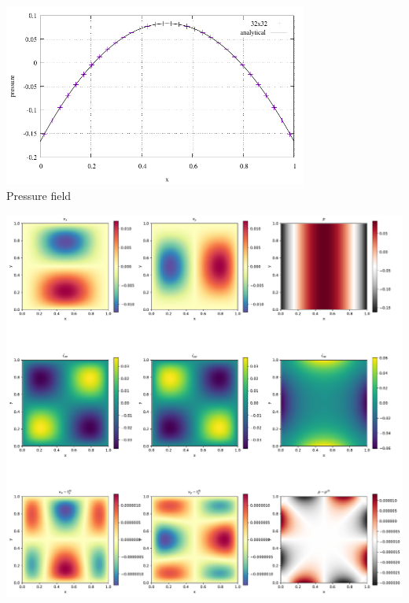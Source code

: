 \begin{center}
\includegraphics[width=10cm]{python_codes/fieldstone_01/results/pressure.pdf}\\
{\captionfont Pressure field}
\end{center}

\begin{center}
\includegraphics[width=15cm]{python_codes/fieldstone_01/solution.pdf}
\end{center}


